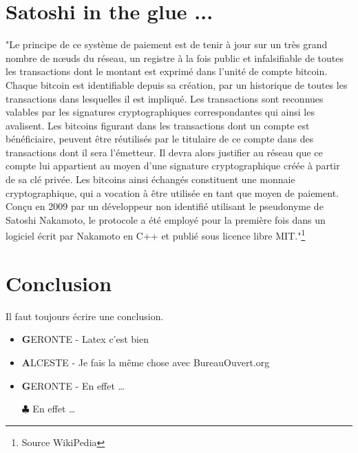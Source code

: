 \documentclass[twocolumn,a4paper]{IEEEtranfr}
\begin{document}
\section{Satoshi in the glue ...}
"Le principe de ce système de paiement est de tenir à jour sur un très grand nombre de nœuds du réseau, un registre à la fois public et infalsifiable de toutes les transactions dont le montant est exprimé dans l'unité de compte bitcoin. Chaque bitcoin est identifiable depuis sa création, par un historique de toutes les transactions dans lesquelles il est impliqué. Les transactions sont reconnues valables par les signatures cryptographiques correspondantes qui ainsi les avalisent. Les bitcoins figurant dans les transactions dont un compte est bénéficiaire, peuvent être réutilisés par le titulaire de ce compte dans des transactions dont il sera l'émetteur. Il devra alors justifier au réseau que ce compte lui appartient au moyen d'une signature cryptographique créée à partir de sa clé privée. Les bitcoins ainsi échangés constituent une monnaie cryptographique, qui a vocation à être utilisée en tant que moyen de paiement.
Conçu en 2009 par un développeur non identifié utilisant le pseudonyme de Satoshi Nakamoto, le protocole a été employé pour la première fois dans un logiciel écrit par Nakamoto en C++ et publié sous licence libre MIT."\footnote{Source WikiPedia}
\section{Conclusion}
Il faut toujours écrire une conclusion. 
\begin{itemize}
  \item {\textbf GERONTE} - Latex c'est bien 
  \item {\textbf ALCESTE} - Je fais la même chose avec BureauOuvert.org
  \item {\textbf GERONTE} - En effet \dots
  \item[$\clubsuit$] En effet \dots
\end{itemize}
% 


{}


\end{document}
